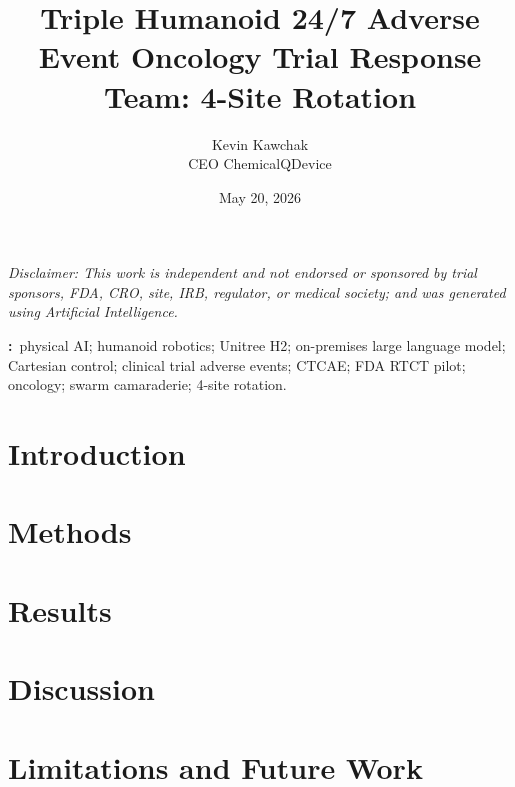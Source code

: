 \documentclass[11pt]{article}
\title{Triple Humanoid 24/7 Adverse Event Oncology Trial Response Team: 4-Site Rotation}
\author{%
  Kevin Kawchak\hspace{2pt}\orcidicon{0009-0007-5457-8667}\\
  CEO ChemicalQDevice\\
  \doiLink{10.5281/zenodo.xxxxxxxx}
}
\date{May 20, 2026}
\begin{document}
\maketitle

\begin{center}
\small\itshape
Disclaimer: This work is independent and not endorsed or sponsored by trial sponsors, FDA, CRO, site, IRB, regulator, or medical society; and was generated using Artificial Intelligence.
\end{center}

\vspace{0.4em}

\begin{abstract}

\end{abstract}

\noindent\textbf{\keywordsname:}\ physical AI; humanoid robotics; Unitree H2; on-premises large language model; Cartesian control; clinical trial adverse events; CTCAE; FDA RTCT pilot; oncology; swarm camaraderie; 4-site rotation.

\section{Introduction}
\label{sec:introduction}


\newpage
{}
{}
\tableofcontents
\newpage

\section{Methods}
\label{sec:methods}


\section{Results}
\label{sec:results}


\section{Discussion}
\label{sec:discussion}


\section{Limitations and Future Work}
\label{sec:limitations}

\end{document}
